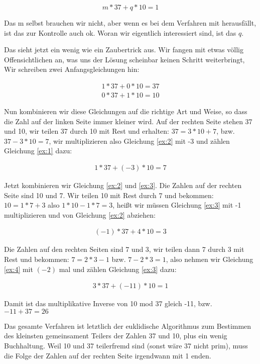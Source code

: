 \documentclass{article}
\newcounter{thm}
\begin{document}
$$  m * 37 + q * 10 = 1 $$

Das m selbst brauchen wir nicht, aber wenn es bei dem Verfahren mit
herausfällt, ist das zur Kontrolle auch ok. Woran wir eigentlich interessiert
sind, ist das $q$.

Das sieht jetzt ein wenig wie ein Zaubertrick aus. Wir fangen mit etwas völlig
Offensichtlichen an, was uns der Lösung scheinbar keinen Schritt weiterbringt,
Wir schreiben zwei Anfangsgleichungen hin:

\begin{eqnarray}
    1 * 37 + 0 * 10 = 37  \label{ex:1} \\
    0 * 37 + 1 * 10 = 10  \label{ex:2}
\end{eqnarray}

Nun kombinieren wir diese Gleichungen auf die richtige Art und Weise, so dass
die Zahl auf der linken Seite immer kleiner wird. Auf der rechten Seite stehen
37 und 10, wir teilen 37 durch 10 mit Rest und erhalten: $37 = 3*10 + 7$,
bzw. $37 - 3 * 10 = 7$, wir multiplizieren also Gleichung \eqref{ex:2} mit -3 und
zählen Gleichung \eqref{ex:1} dazu:

\begin{eqnarray}
    1 *37 + (-3) * 10 = 7 \label{ex:3}
\end{eqnarray}

Jetzt kombinieren wir Gleichung \eqref{ex:2} und \eqref{ex:3}.
Die Zahlen auf der rechten Seite
sind 10 und 7. Wir teilen 10 mit Rest durch 7 und bekommen: $10 = 1 * 7 + 3$
also $1 * 10 - 1 * 7 = 3$, heißt wir müssen Gleichung \eqref{ex:3} mit -1
multiplizieren und von Gleichung \eqref{ex:2} abziehen:

\begin{eqnarray}
    (-1) * 37 + 4 * 10 = 3 \label{ex:4}
\end{eqnarray}

Die Zahlen auf den rechten Seiten sind 7 und 3, wir teilen dann 7 durch 3 mit
Rest und bekommen: $7 = 2*3 - 1$ bzw. $7 - 2*3 = 1$, also nehmen wir Gleichung
\eqref{ex:4} mit $(-2)$ mal und zählen Gleichung \eqref{ex:3} dazu:

\begin{eqnarray}
    3 * 37 + (-11) * 10 = 1
\end{eqnarray}

Damit ist das multiplikative Inverse von 10 mod 37 gleich -11, bzw. $-11 + 37
= 26$

Das gesamte Verfahren ist letztlich der euklidische Algorithmus zum Bestimmen
des kleinsten gemeinsament Teilers der Zahlen 37 und 10, plus ein wenig
Buchhaltung. Weil 10 und 37 teilerfremd sind (sonst wäre 37 nicht prim), muss
die Folge der Zahlen auf der rechten Seite irgendwann mit 1 enden.
\end{document}
